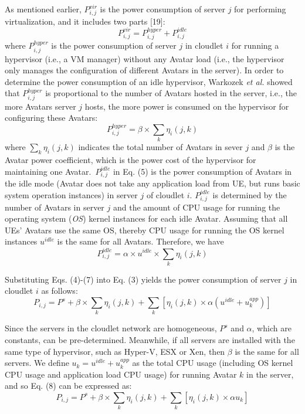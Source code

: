 \documentclass[journal,12pt,draftclsnofoot,onecolumn]{IEEEtran}
\begin{document}
As mentioned earlier, $P_{i,j}^{vir}$ is the power consumption of server $j$ for performing virtualization, and it includes two parts [19]:		
		\begin{equation}
			P_{i,j}^{vir}=P_{i,j}^{hyper}+P_{i,j}^{idle}
		\end{equation}		
where $P_{i,j}^{hyper}$ is the power consumption of server $j$ in cloudlet $i$ for running a hypervisor (i.e., a VM manager) without any Avatar load (i.e., the hypervisor only manages the configuration of different Avatars in the server). In order to determine the power consumption of an idle hypervisor, Warkozek \emph{et al.} \cite{19} showed that $P_{i,j}^{hyper}$ is proportional to the number of Avatars hosted in the server, i.e., the more Avatars server $j$ hosts, the more power is consumed on the hypervisor for configuring these Avatars:		
		\begin{equation}
			P_{i,j}^{hyper}=\beta \times \sum\limits_{k}{{{\eta }_{i}}\left( j,k \right)}
		\end{equation}		
where $\sum\nolimits_{k}{{{\eta }_{i}}(j,k)}$ indicates the total number of Avatars in sever $j$ and $\beta$ is the Avatar power coefficient, which is the power cost of the hypervisor for maintaining one Avatar.\
$P_{i,j}^{idle}$ in Eq. (5) is the power consumption of Avatars in the idle mode (Avatar does not take any application load from UE, but runs basic system operation instances) in server $j$ of cloudlet $i$. $P_{i,j}^{idle}$ is determined by the number of Avatars in server $j$ and the amount of CPU usage for running the operating system (\emph{OS}) kernel instances for each idle Avatar. Assuming that all UEs' Avatars use the same OS, thereby CPU usage for running the OS kernel instances $u^{idle}$ is the same for all Avatars. Therefore, we have
		\begin{equation}
		P_{i,j}^{idle}=\alpha \times {{u}^{idle}}\times \sum\limits_{k}{{{\eta }_{i}}\left( j,k \right)}
		\end{equation}
		
Substituting Eqs. (4)-(7) into Eq. (3) yields the power consumption of server $j$ in cloudlet $i$ as follows:		 
		\begin{equation}
		{{P}_{i,j}}={{P}^{s}}+\beta \times \sum\limits_{k}{{{\eta }_{i}}\left( j,k \right)}+\sum\limits_{k}{\left[ {{\eta }_{i}}\left( j,k \right)\times \alpha \left( {{u}^{idle}}+u_{k}^{app} \right) \right]}
		\end{equation}
		
		Since the servers in the cloudlet network are homogeneous, $P^s$ and $\alpha$, which are constants, can be pre-determined. Meanwhile, if all servers are installed with the same type of hypervisor, such as Hyper-V, ESX or Xen, then $\beta$ is the same for all servers. We define ${{u}_{k}}={{u}^{idle}}+u_{k}^{app}$ as the total CPU usage (including OS kernel CPU usage and application load CPU usage) for running Avatar $k$ in the server, and so Eq. (8) can be expressed as:
		\begin{equation}
			{{P}_{i,j}}={{P}^{s}}+\beta \times \sum\limits_{k}{{{\eta }_{i}}\left( j,k \right)}+\sum\limits_{k}{\left[ {{\eta }_{i}}\left( j,k \right)\times \alpha {{u}_{k}} \right]}
		\end{equation}
\end{document}
